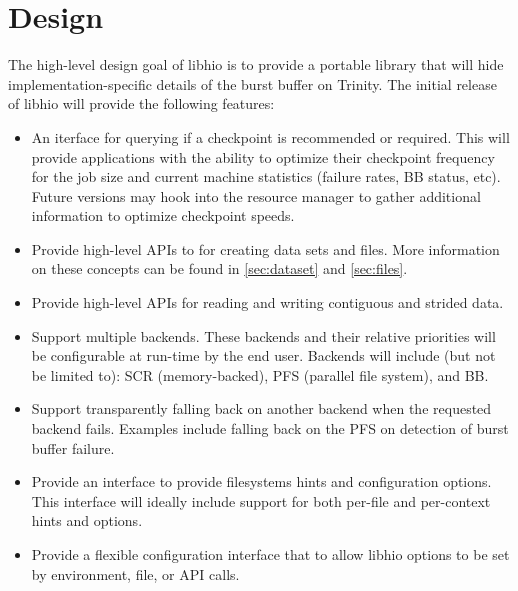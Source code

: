 \section{Design}
\label{sec:design}
The high-level design goal of libhio is to provide a portable library
that will hide implementation-specific details of the burst buffer on
Trinity. The initial release of libhio will provide the following features:

\begin{itemize}
\item An iterface for querying if a checkpoint is recommended or
  required. This will provide applications with the ability to
  optimize their checkpoint frequency for the job size and current
  machine statistics (failure rates, BB status, etc). Future versions
  may hook into the resource manager to gather additional information
  to optimize checkpoint speeds.
\item Provide high-level APIs to for creating data sets and
  files. More information on these concepts can be found in
  \ref{sec:dataset} and \ref{sec:files}.
\item Provide high-level APIs for reading and writing contiguous and
  strided data.
\item Support multiple backends. These backends and their relative
  priorities will be configurable at run-time by the end
  user. Backends will include (but not be limited to): SCR
  (memory-backed), PFS (parallel file system), and BB.
\item Support transparently falling back on another backend when
  the requested backend fails. Examples include falling back on the
  PFS on detection of burst buffer failure.
\item Provide an interface to provide filesystems hints and
  configuration options. This interface will ideally include support
  for both per-file and per-context hints and options.
\item Provide a flexible configuration interface that to allow libhio
  options to be set by environment, file, or API calls.
\end{itemize}
